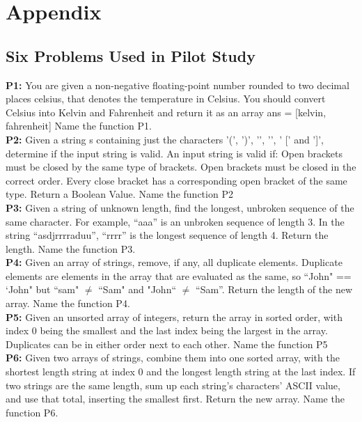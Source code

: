 \documentclass[manuscript,screen,review,sigconf]{acmart}
\begin{document}



\section{Appendix}

\subsection{Six Problems Used in Pilot Study}

\textbf{P1:} You are given a non-negative floating-point number rounded to two decimal places celsius, that denotes the temperature in Celsius. You should convert Celsius into Kelvin and Fahrenheit and return it as an array ans = [kelvin, fahrenheit] Name the function P1.\\

\textbf{P2:} Given a string s containing just the characters '(', ')', '{', '}', ' [' and ']', determine if the input string is valid. An input string is valid if: Open brackets must be closed by the same type of brackets. Open brackets must be closed in the correct order. Every close bracket has a corresponding open bracket of the same type. Return a Boolean Value. Name the function P2\\

\textbf{P3:} Given a string of unknown length, find the longest, unbroken sequence of the same character. For example, “aaa” is an unbroken sequence of length 3. In the string “asdjrrrraduu”, “rrrr” is the longest sequence of length 4. Return the length. Name the function P3.\\

\textbf{P4:} Given an array of strings, remove, if any, all duplicate elements. Duplicate elements are elements in the array that are evaluated as the same, so ``John" == `John" but ``sam" $\neq$ ``Sam" and "John`` $\neq$ “Sam”. Return the length of the new array. Name the function P4.\\

\textbf{P5:} Given an unsorted array of integers, return the array in sorted order, with index 0 being the smallest and the last index being the largest in the array. Duplicates can be in either order next to each other. Name the function P5\\

\textbf{P6:} Given two arrays of strings, combine them into one sorted array, with the shortest length string at index 0 and the longest length string at the last index. If two strings are the same length, sum up each string’s characters’ ASCII value, and use that total, inserting the smallest first. Return the new array. Name the function P6.\\
\end{document}
